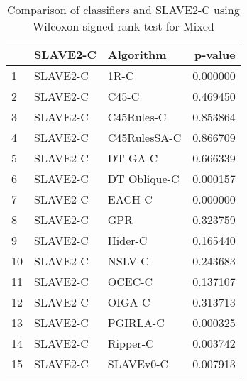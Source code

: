 \begin{table}
\footnotesize
\caption{Comparison of classifiers and SLAVE2-C using Wilcoxon signed-rank test for Mixed}
\label{tab:SLAVE2-C wilcoxon Mixed comparison}
\begin{tabular}{lllr}
\hline
 & SLAVE2-C & Algorithm & p-value \\
\hline
1 & SLAVE2-C & 1R-C & 0.000000 \\
2 & SLAVE2-C & C45-C & 0.469450 \\
3 & SLAVE2-C & C45Rules-C & 0.853864 \\
4 & SLAVE2-C & C45RulesSA-C & 0.866709 \\
5 & SLAVE2-C & DT GA-C & 0.666339 \\
6 & SLAVE2-C & DT Oblique-C & 0.000157 \\
7 & SLAVE2-C & EACH-C & 0.000000 \\
8 & SLAVE2-C & GPR & 0.323759 \\
9 & SLAVE2-C & Hider-C & 0.165440 \\
10 & SLAVE2-C & NSLV-C & 0.243683 \\
11 & SLAVE2-C & OCEC-C & 0.137107 \\
12 & SLAVE2-C & OIGA-C & 0.313713 \\
13 & SLAVE2-C & PGIRLA-C & 0.000325 \\
14 & SLAVE2-C & Ripper-C & 0.003742 \\
15 & SLAVE2-C & SLAVEv0-C & 0.007913 \\
\hline
\end{tabular}
\end{table}
